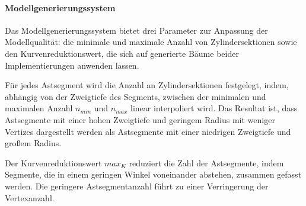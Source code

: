 \paragraph{Modellgenerierungssystem}

Das Modellgenerierungssystem bietet drei Parameter zur Anpassung der Modellqualität: die minimale und maximale Anzahl von Zylindersektionen sowie den Kurvenreduktionswert, die sich auf generierte Bäume beider Implementierungen anwenden lassen.

Für jedes Astsegment wird die Anzahl an Zylindersektionen festgelegt, indem, abhängig von der Zweigtiefe des Segments, zwischen der minimalen und maximalen Anzahl $n_{min}$ und $n_{max}$ linear interpoliert wird. Das Resultat ist, dass Astsegmente mit einer hohen Zweigtiefe und geringem Radius mit weniger Vertizes dargestellt werden als Astsegmente mit einer niedrigen Zweigtiefe und großem Radius.

Der Kurvenreduktionswert $max_K$ reduziert die Zahl der Astsegmente, indem Segmente, die in einem geringen Winkel voneinander abstehen, zusammen gefasst werden. Die geringere Astsegmentanzahl führt zu einer Verringerung der Vertexanzahl.

